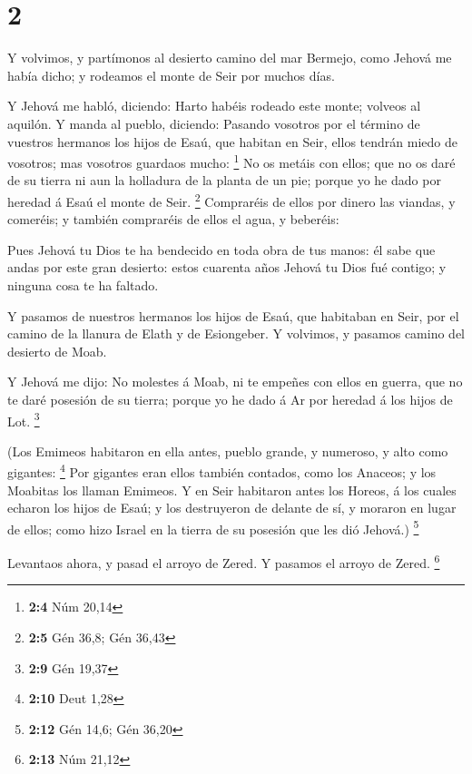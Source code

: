 \hypertarget{section-1}{%
\section{2}\label{section-1}}

 Y volvimos, y partímonos al desierto camino del mar
Bermejo, como Jehová me había dicho; y rodeamos el monte de Seir por
muchos días.

 Y Jehová me habló, diciendo:  Harto habéis
rodeado este monte; volveos al aquilón.  Y manda al pueblo,
diciendo: Pasando vosotros por el término de vuestros hermanos los hijos
de Esaú, que habitan en Seir, ellos tendrán miedo de vosotros; mas
vosotros guardaos mucho: \footnote{\textbf{2:4} Núm 20,14} 
No os metáis con ellos; que no os daré de su tierra ni aun la holladura
de la planta de un pie; porque yo he dado por heredad á Esaú el monte de
Seir. \footnote{\textbf{2:5} Gén 36,8; Gén 36,43} 
Compraréis de ellos por dinero las viandas, y comeréis; y también
compraréis de ellos el agua, y beberéis:

 Pues Jehová tu Dios te ha bendecido en toda obra de tus
manos: él sabe que andas por este gran desierto: estos cuarenta años
Jehová tu Dios fué contigo; y ninguna cosa te ha faltado.

 Y pasamos de nuestros hermanos los hijos de Esaú, que
habitaban en Seir, por el camino de la llanura de Elath y de Esiongeber.
Y volvimos, y pasamos camino del desierto de Moab.

 Y Jehová me dijo: No molestes á Moab, ni te empeñes con
ellos en guerra, que no te daré posesión de su tierra; porque yo he dado
á Ar por heredad á los hijos de Lot. \footnote{\textbf{2:9} Gén 19,37}

 (Los Emimeos habitaron en ella antes, pueblo grande, y
numeroso, y alto como gigantes: \footnote{\textbf{2:10} Deut 1,28}
 Por gigantes eran ellos también contados, como los
Anaceos; y los Moabitas los llaman Emimeos.  Y en Seir
habitaron antes los Horeos, á los cuales echaron los hijos de Esaú; y
los destruyeron de delante de sí, y moraron en lugar de ellos; como hizo
Israel en la tierra de su posesión que les dió Jehová.) \footnote{\textbf{2:12}
  Gén 14,6; Gén 36,20}

 Levantaos ahora, y pasad el arroyo de Zered. Y pasamos el
arroyo de Zered. \footnote{\textbf{2:13} Núm 21,12}

